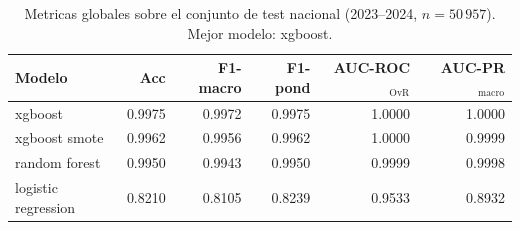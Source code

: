 \begin{table}[ht]
\centering
\small
\caption{Metricas globales sobre el conjunto de test nacional (2023--2024, $n=50\,957$). Mejor modelo: xgboost.}
\label{tab:metricas_test_por_modelo}
\begin{tabular}{l rrrrr}
\toprule
Modelo & Acc & F1-macro & F1-pond & AUC-ROC$_{\text{OvR}}$ & AUC-PR$_{\text{macro}}$ \\
\midrule
xgboost & 0.9975 & 0.9972 & 0.9975 & 1.0000 & 1.0000 \\
xgboost smote & 0.9962 & 0.9956 & 0.9962 & 1.0000 & 0.9999 \\
random forest & 0.9950 & 0.9943 & 0.9950 & 0.9999 & 0.9998 \\
logistic regression & 0.8210 & 0.8105 & 0.8239 & 0.9533 & 0.8932 \\
\bottomrule
\end{tabular}
\end{table}

